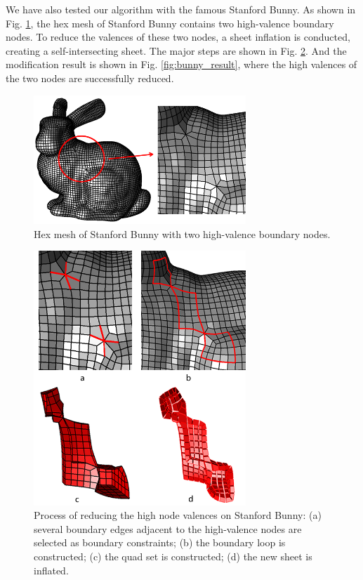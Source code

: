 \documentclass[final,5p,times,twocolumn]{elsarticle}
\begin{document}
We have also tested our algorithm with the famous Stanford Bunny. As shown in Fig. \ref{fig:bunny_input}, the hex mesh of Stanford Bunny contains two high-valence boundary nodes. To reduce the valences of these two nodes, a sheet inflation is conducted, creating a self-intersecting sheet. The major steps are shown in Fig. \ref{fig:bunny_proc}. And the modification result is shown in Fig. \ref{fig:bunny_result}, where  the high valences of the two nodes are successfully reduced.

\begin{figure}[htbp]
\begin{center}
\includegraphics[width=8cm]{rev_figures/bunny_input.png}
\caption{Hex mesh of Stanford Bunny with two high-valence boundary nodes.}
\label{fig:bunny_input}
\end{center}
\end{figure}


\begin{figure}[htbp]
\begin{center}
\includegraphics[width=8cm]{rev_figures/bunny_proc.png}
\caption{Process of reducing the high node valences on Stanford Bunny: (a) several boundary edges adjacent to the high-valence nodes are selected as boundary constraints; (b) the boundary loop is constructed; (c) the quad set is constructed; (d) the new sheet is inflated.}
\label{fig:bunny_proc}
\end{center}
\end{figure}
\end{document}
